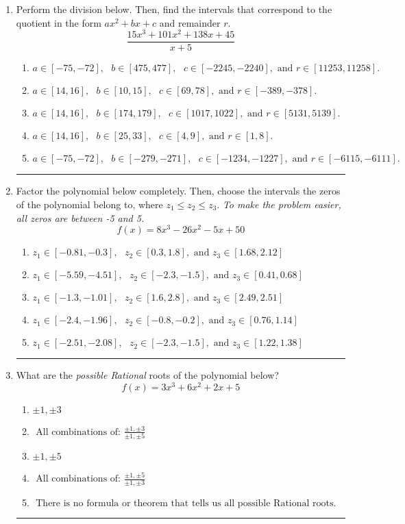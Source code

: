 \documentclass[14pt]{extbook}
\newcommand{\litem}[1]{\item#1\hspace*{-1cm}\rule{\textwidth}{0.4pt}}
\begin{document}
\begin{enumerate}
{\begin{enumerate}[label=\Alph*.]
\end{enumerate} }
\litem{
Perform the division below. Then, find the intervals that correspond to the quotient in the form $ax^2+bx+c$ and remainder $r$.\[ \frac{15x^{3} +101 x^{2} +138 x + 45}{x + 5} \]\begin{enumerate}[label=\Alph*.]
\item \( a \in [-75, -72], \text{   } b \in [475, 477], \text{   } c \in [-2245, -2240], \text{   and   } r \in [11253, 11258]. \)
\item \( a \in [14, 16], \text{   } b \in [10, 15], \text{   } c \in [69, 78], \text{   and   } r \in [-389, -378]. \)
\item \( a \in [14, 16], \text{   } b \in [174, 179], \text{   } c \in [1017, 1022], \text{   and   } r \in [5131, 5139]. \)
\item \( a \in [14, 16], \text{   } b \in [25, 33], \text{   } c \in [4, 9], \text{   and   } r \in [1, 8]. \)
\item \( a \in [-75, -72], \text{   } b \in [-279, -271], \text{   } c \in [-1234, -1227], \text{   and   } r \in [-6115, -6111]. \)

\end{enumerate} }
\litem{
Factor the polynomial below completely. Then, choose the intervals the zeros of the polynomial belong to, where $z_1 \leq z_2 \leq z_3$. \textit{To make the problem easier, all zeros are between -5 and 5.}\[ f(x) = 8x^{3} -26 x^{2} -5 x + 50 \]\begin{enumerate}[label=\Alph*.]
\item \( z_1 \in [-0.81, -0.3], \text{   }  z_2 \in [0.3, 1.8], \text{   and   } z_3 \in [1.68, 2.12] \)
\item \( z_1 \in [-5.59, -4.51], \text{   }  z_2 \in [-2.3, -1.5], \text{   and   } z_3 \in [0.41, 0.68] \)
\item \( z_1 \in [-1.3, -1.01], \text{   }  z_2 \in [1.6, 2.8], \text{   and   } z_3 \in [2.49, 2.51] \)
\item \( z_1 \in [-2.4, -1.96], \text{   }  z_2 \in [-0.8, -0.2], \text{   and   } z_3 \in [0.76, 1.14] \)
\item \( z_1 \in [-2.51, -2.08], \text{   }  z_2 \in [-2.3, -1.5], \text{   and   } z_3 \in [1.22, 1.38] \)

\end{enumerate} }
\litem{
What are the \textit{possible Rational} roots of the polynomial below?\[ f(x) = 3x^{3} +6 x^{2} +2 x + 5 \]\begin{enumerate}[label=\Alph*.]
\item \( \pm 1,\pm 3 \)
\item \( \text{ All combinations of: }\frac{\pm 1,\pm 3}{\pm 1,\pm 5} \)
\item \( \pm 1,\pm 5 \)
\item \( \text{ All combinations of: }\frac{\pm 1,\pm 5}{\pm 1,\pm 3} \)
\item \( \text{ There is no formula or theorem that tells us all possible Rational roots.} \)


\end{enumerate}}
\end{enumerate}
\end{document}

